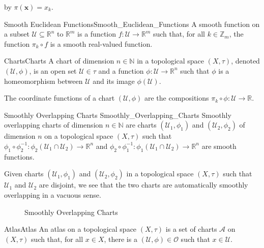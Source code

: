     by $\pi(\mathbf{x})=x_{k}$.
    \begin{ldefinition}{Smooth Euclidean Functions}{Smooth_Euclidean_Functions}
        A smooth function on a subset $\mathcal{U}\subseteq\mathbb{R}^{n}$
        to $\mathbb{R}^{m}$ is a function
        $f:\mathcal{U}\rightarrow\mathbb{R}^{m}$ such that, for all
        $k\in\mathbb{Z}_{m}$, the function $\pi_{k}\circ{f}$ is a smooth
        real-valued function.
    \end{ldefinition}
    \begin{ldefinition}{Charts}{Charts}
        A chart of dimension $n\in\mathbb{N}$ in a topological space
        $(X,\tau)$, denoted $(\mathcal{U},\phi)$, is an open set
        $\mathcal{U}\in\tau$ and a function
        $\phi:\mathcal{U}\rightarrow\mathbb{R}^{n}$ such that $\phi$ is
        a homeomorphism between $\mathcal{U}$ and its image
        $\phi(\mathcal{U})$.
    \end{ldefinition}
    The coordinate functions of a chart $(\mathcal{U},\phi)$ are the
    compositions $\pi_{k}\circ\phi:\mathcal{U}\rightarrow\mathbb{R}$.
    \begin{fdefinition}{Smoothly Overlapping Charts}
                       {Smoothly_Overlapping_Charts}
        Smoothly overlapping charts of dimension $n\in\mathbb{N}$ are
        charts $(\mathcal{U}_{1},\phi_{1})$ and
        $(\mathcal{U}_{2},\phi_{2})$ of dimension $n$ on a topological
        space $(X,\tau)$ such that
        $\phi_{1}\circ\phi_{2}^{\minus{1}}:%
         \phi_{2}(\mathcal{U}_{1}\cap\mathcal{U}_{2})%
         \rightarrow\mathbb{R}^{n}$ and
        $\phi_{2}\circ\phi_{1}^{\minus{1}}:%
         \phi_{1}(\mathcal{U}_{1}\cap\mathcal{U}_{2})%
         \rightarrow\mathbb{R}^{n}$ are smooth functions.
    \end{fdefinition}
    Given charts $(\mathcal{U}_{1},\phi_{1})$ and
    $(\mathcal{U}_{2},\phi_{2})$ in a topological space $(X,\tau)$ such
    that $\mathcal{U}_{1}$ and $\mathcal{U}_{2}$ are disjoint, we see that
    the two charts are automatically smoothly overlapping in a
    vacuous sense.
    \begin{figure}[H]
        \centering
        \captionsetup{type=figure}
        
        \caption{Smoothly Overlapping Charts}
        \label{fig:Smoothly_Overlapping_Charts}
    \end{figure}
    \begin{fdefinition}{Atlas}{Atlas}
        An atlas on a topological space $(X,\tau)$ is a set of charts
        $\mathcal{A}$ on $(X,\tau)$ such that, for all $x\in{X}$, there
        is a $(\mathcal{U},\phi)\in\mathcal{O}$ such that $x\in\mathcal{U}$.
    \end{fdefinition}
